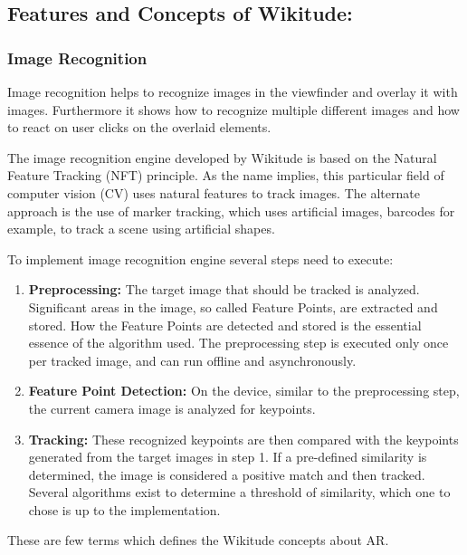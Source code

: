 \documentclass{article}
\begin{document}
\subsection{ Features and Concepts of Wikitude: }\cite{wikitude}

\subsubsection{Image Recognition }
\par Image recognition helps to recognize images in the viewfinder and overlay it with images. Furthermore it shows how to recognize multiple different images and how to react on user clicks on the overlaid elements. 
\par The image recognition engine developed by Wikitude is based on the Natural Feature Tracking (NFT) principle. As the name implies, this particular field of computer vision (CV) uses natural features to track images. The alternate approach is the use of marker tracking, which uses artificial images, barcodes for example, to track a scene using artificial shapes. 

\par To implement image recognition engine several steps need to execute: 
\begin{enumerate}
\item \textbf{Preprocessing:} The target image that should be tracked is analyzed. Significant areas in the image, so called Feature Points, are extracted and stored. How the Feature Points are detected and stored is the essential essence of the algorithm used. The preprocessing step is executed only once per tracked image, and can run offline and asynchronously.

\item \textbf{Feature Point Detection:}  On the device, similar to the preprocessing step, the current camera image is analyzed for keypoints. 

\item \textbf{Tracking: } These recognized keypoints are then compared with the keypoints generated from the target images in step 1. If a pre-defined similarity is determined, the image is considered a positive match and then tracked. Several algorithms exist to determine a threshold of similarity, which one to chose is up to the implementation. 
\end{enumerate}
\par These are few terms which defines the Wikitude concepts about AR. 
\end{document}
